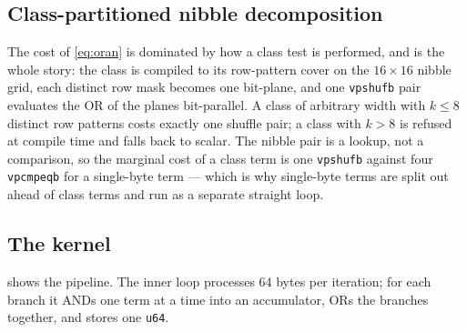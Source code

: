 \documentclass[11pt,letterpaper]{article}
\begin{document}
\subsection{Class-partitioned nibble decomposition}
The cost of \eqref{eq:oran} is dominated by how a class test is performed,
and  is the whole story: the class is compiled to its
row-pattern cover on the $16\times16$ nibble grid, each distinct row mask
becomes one bit-plane, and one \texttt{vpshufb} pair evaluates the OR of
the planes bit-parallel. A class of arbitrary width with $k\le 8$ distinct
row patterns costs exactly one shuffle pair; a class with $k>8$ is refused
at compile time and falls back to scalar. The nibble pair is a lookup, not
a comparison, so the marginal cost of a class term is one \texttt{vpshufb}
against four \texttt{vpcmpeqb} for a single-byte term --- which is why
single-byte terms are split out ahead of class terms and run as a separate
straight loop.

\subsection{The kernel}
 shows the pipeline. The inner loop processes 64 bytes per
iteration; for each branch it ANDs one term at a time into an accumulator,
ORs the branches together, and stores one \texttt{u64}.
\end{document}
